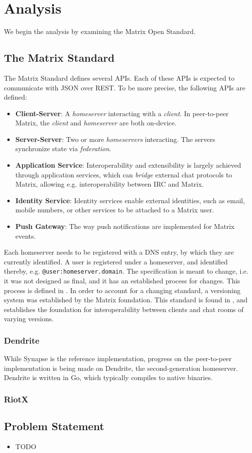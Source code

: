 \chapter{Analysis}
We begin the analysis by examining the Matrix Open Standard.

\section{The Matrix Standard}
The Matrix Standard defines several \ac{API}s.
Each of these \ac{API}s is expected to communicate with \ac{JSON} over \ac{REST}.
To be more precise, the following \ac{API}s are defined:
\begin{itemize}
    \item \textbf{Client-Server}: A \textit{homeserver} interacting with a \textit{client}. In peer-to-peer Matrix, the \textit{client} and \textit{homeserver} are both on-device.
    \item \textbf{Server-Server}: Two or more \textit{homeservers} interacting. The servers synchronize state via \textit{federation}.
    \item \textbf{Application Service}: Interoperability and extensibility is largely achieved through application services, which can \textit{bridge} external chat protocols to Matrix, allowing e.g. interoperability between \ac{IRC} and Matrix.
    \item \textbf{Identity Service}: Identity services enable external identities, such as email, mobile numbers, or other services to be attached to a Matrix user.
    \item \textbf{Push Gateway}: The way push notifications are implemented for Matrix events.
\end{itemize}

Each homeserver needs to be registered with a DNS entry, by which they are currently identified.
A user is registered under a homeserver, and identified thereby, e.g. \texttt{@user:homeserver.domain}.
The specification is meant to change, i.e. it was not designed as final, and it has an established process for changes.
This process is defined in \cite{matrix_org_spec_changes}.
In order to account for a changing standard, a versioning system was established by the Matrix foundation.
This standard is found in \cite{matrix_org_spec}, and establishes the foundation for interoperability between clients and chat rooms of varying versions.

\subsection{Dendrite}
While Synapse is the reference implementation, progress on the peer-to-peer implementation is being made on Dendrite, the second-generation homeserver.
Dendrite is written in Go, which typically compiles to native binaries.

\subsection{RiotX}

\section{Problem Statement}
\begin{itemize}
    \item TODO
\end{itemize}
